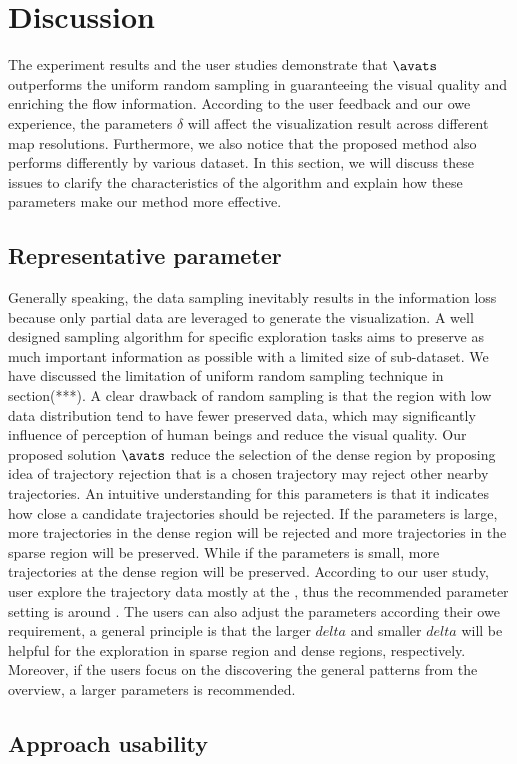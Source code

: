 \section{Discussion}

The experiment results and the user studies demonstrate that $\avats$ outperforms the uniform random sampling in guaranteeing the visual quality and enriching the flow information. According to the user feedback and our owe experience, the parameters $\delta$ will affect the visualization result across different map resolutions. Furthermore, we also notice that the proposed method also performs differently by various dataset. In this section, we will discuss these issues to clarify the characteristics of the algorithm and explain how these parameters make our method more effective.

\subsection{Representative parameter} 
Generally speaking, the data sampling inevitably results in the information loss because only partial data are leveraged to generate the visualization. A well designed sampling algorithm for specific exploration tasks aims to preserve as much important information as possible with a limited size of sub-dataset. We have discussed the limitation of uniform random sampling technique in section(***). A clear drawback of random sampling is that the region with low data distribution tend to have fewer preserved data, which may significantly influence of perception of human beings and reduce the visual quality. Our proposed solution $\avats$ reduce the selection of the dense region by proposing idea of trajectory rejection that is a chosen trajectory may reject other nearby trajectories. An intuitive understanding for this parameters is that it indicates how close a candidate trajectories should be rejected. If the parameters is large, more trajectories in the dense region will be rejected and more trajectories in the sparse region will be preserved. While if the parameters is small, more trajectories at the dense region will be preserved. According to our user study, user explore the trajectory data mostly at the , thus the recommended parameter setting is around . The users can also adjust the parameters according their owe requirement, a general principle is that the larger $delta$ and smaller $delta$ will be helpful for the exploration in sparse region and dense regions, respectively. Moreover, if the users focus on the discovering the general patterns from the overview, a larger parameters is recommended.

\subsection{Approach usability}